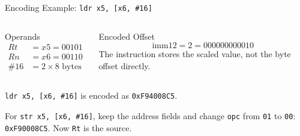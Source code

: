 \documentclass[aspectratio=169,11pt,t]{beamer}
\newcommand{\hex}[1]{\texttt{0x#1}}
\newcommand{\code}[1]{\texttt{#1}}
\newcommand{\bfld}[5]{%
  \pgfmathsetmacro{\cx}{#1 + #3/2}%
  \fill[#5] (#1,#2) rectangle ++(#3,0.72);%
  \draw[navy,line width=0.7pt] (#1,#2) rectangle ++(#3,0.72);%
  \node[font=\scriptsize\ttfamily,text height=1.5ex,text depth=0.35ex,align=center,text=darkgray] at (\cx,#2+0.36) {#4};%
}
\begin{document}
\begin{frame}{Encoding Example: \texttt{ldr x5, [x6, \#16]}}

\begin{columns}[T,onlytextwidth]
\begin{block}{Operands}
\[
\begin{aligned}
Rt &= x5 = 00101 \\
Rn &= x6 = 00110 \\
\#16 &= 2 \times 8\text{ bytes}
\end{aligned}
\]
\end{block}

\begin{block}{Encoded Offset}
\[
\text{imm12} = 2 = 000000000010
\]
The instruction stores the scaled value, not the byte offset directly.
\end{block}
\end{columns}

\vspace{0.2cm}

\begin{center}
\end{center}

\vspace{0.1cm}

\centering
\code{ldr x5, [x6, \#16]} is encoded as \hex{F94008C5}.
\par\vspace{0.1cm}\small\raggedright
For \code{str x5, [x6, \#16]}, keep the address fields and change \code{opc} from \code{01} to \code{00}: \hex{F90008C5}. Now \code{Rt} is the source.

\end{frame}




\end{document}
